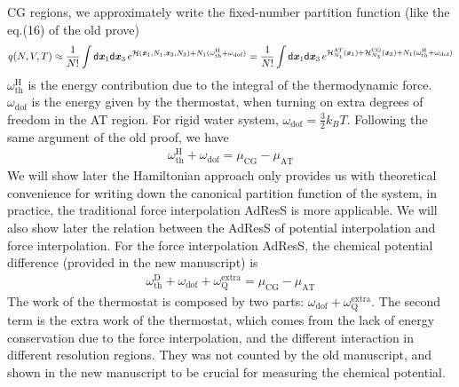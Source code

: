 \documentclass[aip,jcp,a4paper,reprint,onecolumn]{revtex4-1}
\newcommand{\redc}[1]{{\color{red} #1}}
\newcommand{\vect}[1]{\textbf{\textit{#1}}}
\newcommand{\dd}[0]{\textsf{d}}
\newcommand{\AT}{{\textrm{{AT}}}}
\newcommand{\CG}{{\textrm{CG}}}
\newcommand{\thf}{{\textrm{th}}}
\newcommand{\dof}{{\textrm{dof}}}
\newcommand{\ext}{{\textrm{extra}}}
\newcommand{\thermo}{{\textrm{Q}}}
\newcommand{\hadress}{{\textrm{H}}}
\newcommand{\dadress}{{\textrm{D}}}
\newcommand{\mh}{\mathcal H}
\begin{document}
CG regions,
we approximately
write the fixed-number partition function (like the eq.(16) of the old prove)
\begin{align}
  q(N, V, T)
  \approx
  \frac1{N!}\int\dd\vect x_1\dd\vect x_3\,
  e^{\mh(\vect x_1, N_1, \vect x_3, N_3) +  N_1(\omega^\hadress_\thf + \omega_\dof)}
  =
  \frac1{N!}\int\dd\vect x_1\dd\vect x_3\,
  e^{\mh^\AT_{N_1}(\vect x_1) +\mh^\CG_{N_3}( \vect x_3) +
  N_1(\omega^\hadress_\thf + \omega_\dof)}
\end{align}
$\omega^\hadress_\thf$ is the energy contribution due to the integral
of the thermodynamic force.
$\omega_\dof$ is the energy
given by the thermostat, when turning on extra degrees of freedom in
the AT region. For rigid water system, $\omega_\dof = \frac32
k_BT$. Following the same argument of the old proof, we have
\begin{align}\label{eqn:mueq-h}
  \omega^\hadress_\thf + \omega_\dof = \mu_\CG - \mu_\AT
\end{align}
We will show
later the Hamiltonian approach only provides us with theoretical convenience
for writing down the canonical partition function of the system, in
practice, the traditional force interpolation AdResS is more
applicable. We will also show later the relation between the AdResS of
potential interpolation and force interpolation.
For the force interpolation AdResS, the chemical potential difference 
(provided in the new manuscript) is
\begin{align}\label{eqn:mueq-d}
  \omega^\dadress_\thf + \omega_\dof + \omega_\thermo^\ext = \mu_\CG - \mu_\AT  
\end{align}
The work of the thermostat is composed by two parts: $\omega_\dof +
\omega_\thermo^\ext$. The second term is the extra work of the
thermostat, which comes from the lack of energy conservation due to
the force interpolation, and the different interaction in different
resolution regions. They was not counted by the old manuscript, and shown in
the new manuscript to be crucial for measuring the chemical potential.
\\
\end{document}
